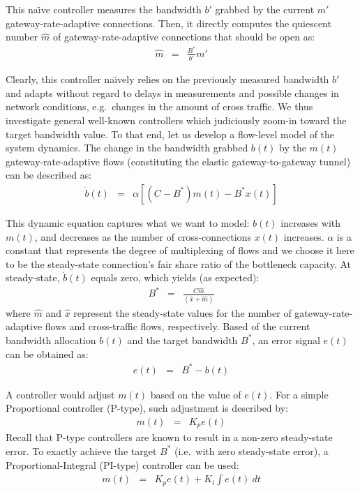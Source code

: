 \documentclass{article}
\begin{document}
This na\"{\i}ve controller 
measures the bandwidth $b'$ grabbed by 
the current $m'$ gateway-rate-adaptive connections.
Then,
it directly computes the quiescent number $\hat{m}$
of gateway-rate-adaptive  connections that should be open as:
\begin{eqnarray*} 
 \label{eqn:q_m} 
 \hat{m} &=& \frac{B^*}{b'}m'
\end{eqnarray*}

\noindent
Clearly, this controller na\"{\i}vely relies on
the previously measured bandwidth $b'$
and adapts without regard to delays in
measurements and possible changes in network conditions,
e.g.\ changes in the amount of cross traffic.
We thus investigate general well-known controllers
which judiciously zoom-in toward the target bandwidth value.
To that end,
let us develop a flow-level model
of the system dynamics. 
The change in
the bandwidth grabbed $b(t)$ by the $m(t)$ 
gateway-rate-adaptive flows (constituting the elastic gateway-to-gateway tunnel) 
can be described as:
\begin{eqnarray*} 
 \label{eqn:b_dot}    
   \dot b(t) &=&   \alpha [ (C-B^*) m(t) - B^* x(t)]
\end{eqnarray*}

\noindent 
This dynamic equation captures what we want to model:
$b(t)$ increases with $m(t)$, and decreases
as the number of cross-connections $x(t)$ increases. 
$\alpha$ is a constant that represents the degree of multiplexing of
flows and we choose it here to be the steady-state connection's fair share
ratio of the bottleneck capacity. 
At steady-state,
$\dot b(t)$ equals zero, which yields (as expected):
\begin{eqnarray*} 
 \label{eqn:m_x_ss}    
   B^* &=&   \frac{C \hat m} {(\hat x+\hat m)}
\end{eqnarray*}
where $\hat m$ and $\hat x$ represent the steady-state values for the
number of gateway-rate-adaptive flows and cross-traffic flows, respectively.
\noindent
Based of the current bandwidth allocation $b(t)$ and the target
bandwidth $B^*$, an error signal $e(t)$ can be obtained as:
\begin{eqnarray*} 
 \label{eqn:e}    
   e(t) &=&   B^* - b(t)
\end{eqnarray*}

A controller would adjust $m(t)$ based on the value
of $e(t)$. 
For a simple
Proportional controller (P-type), such adjustment is described by:
\begin{eqnarray} 
 \label{eqn:p}    
   m(t) &=&  K_p e(t)
\end{eqnarray}
\noindent
Recall that P-type controllers are known to result in a non-zero steady-state error.
To exactly achieve the target $B^*$ (i.e.\ with zero steady-state error),
a Proportional-Integral (PI-type) controller can be used:
\begin{eqnarray} 
 \label{eqn:pi}    
   m(t) &=& K_p e(t)+ K_i \int e(t) \ dt
\end{eqnarray}
\end{document}
